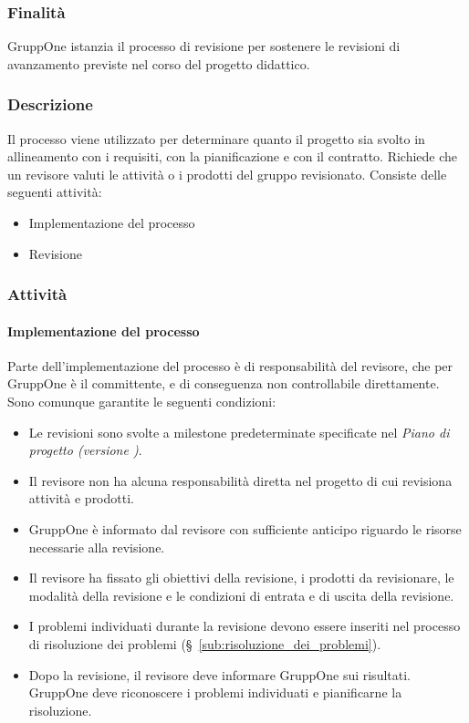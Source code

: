 \documentclass[../../norme-di-progetto.tex]{subfiles}
\begin{document}
\subsubsection{Finalità}%
\label{subs:revisione/finalita}

GruppOne istanzia il processo di revisione per sostenere le revisioni di avanzamento previste nel corso del progetto didattico.

\subsubsection{Descrizione}%
\label{subs:revisione/descrizione}

Il processo viene utilizzato per determinare quanto il progetto sia svolto in allineamento con i requisiti, con la pianificazione e con il contratto.
Richiede che un revisore valuti le attività o i prodotti del gruppo revisionato.
Consiste delle seguenti attività:

\begin{itemize}
  \item Implementazione del processo
  \item Revisione
\end{itemize}

\subsubsection{Attività}%
\label{subs:revisione/attivita}

\paragraph{Implementazione del processo}%
\label{par:implementazione_del_processo}

Parte dell'implementazione del processo è di responsabilità del revisore, che per GruppOne è il committente, e di conseguenza non controllabile direttamente.
Sono comunque garantite le seguenti condizioni:

\begin{itemize}
  \item Le revisioni sono svolte a milestone predeterminate specificate nel \textit{Piano di progetto (versione \versione)}.
  \item Il revisore non ha alcuna responsabilità diretta nel progetto di cui revisiona attività e prodotti.
  \item GruppOne è informato dal revisore con sufficiente anticipo riguardo le risorse necessarie alla revisione.
  \item Il revisore ha fissato gli obiettivi della revisione, i prodotti da revisionare, le modalità della revisione e le condizioni di entrata e di uscita della revisione.
  \item I problemi individuati durante la revisione devono essere inseriti nel processo di risoluzione dei problemi (§~\ref{sub:risoluzione_dei_problemi}).
  \item Dopo la revisione, il revisore deve informare GruppOne sui risultati. GruppOne deve riconoscere i problemi individuati e pianificarne la risoluzione.
\end{itemize}
\end{document}
